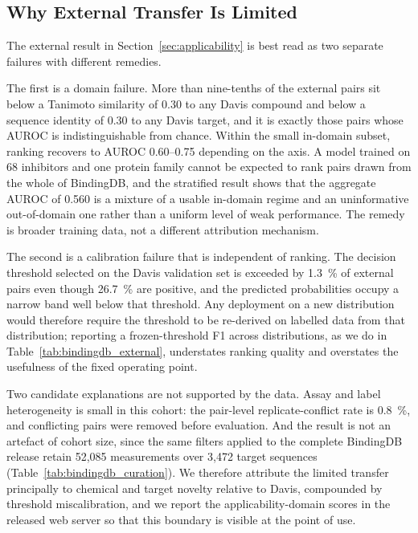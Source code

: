 \documentclass[fleqn,10pt]{wlscirep}
\begin{document}
\subsection{Why External Transfer Is Limited}
\label{sec:transfer}

The external result in Section~\ref{sec:applicability} is best read as two
separate failures with different remedies.

The first is a domain failure.  More than nine-tenths of the external pairs sit
below a Tanimoto similarity of 0.30 to any Davis compound and below a sequence
identity of 0.30 to any Davis target, and it is exactly those pairs whose AUROC
is indistinguishable from chance.  Within the small in-domain subset, ranking
recovers to AUROC 0.60--0.75 depending on the axis.  A model trained on 68
inhibitors and one protein family cannot be expected to rank pairs drawn from
the whole of BindingDB, and the stratified result shows that the aggregate
AUROC of 0.560 is a mixture of a usable in-domain regime and an uninformative
out-of-domain one rather than a uniform level of weak performance.  The remedy
is broader training data, not a different attribution mechanism.

The second is a calibration failure that is independent of ranking.  The
decision threshold selected on the Davis validation set is exceeded by
\SI{1.3}{\percent} of external pairs even though \SI{26.7}{\percent} are
positive, and the predicted probabilities occupy a narrow band well below that
threshold.  Any deployment on a new distribution would therefore require the
threshold to be re-derived on labelled data from that distribution; reporting a
frozen-threshold F1 across distributions, as we do in
Table~\ref{tab:bindingdb_external}, understates ranking quality and overstates
the usefulness of the fixed operating point.

Two candidate explanations are not supported by the data.  Assay and label
heterogeneity is small in this cohort: the pair-level replicate-conflict rate is
\SI{0.8}{\percent}, and conflicting pairs were removed before evaluation.  And
the result is not an artefact of cohort size, since the same filters applied to
the complete BindingDB release retain 52{,}085 measurements over 3{,}472 target
sequences (Table~\ref{tab:bindingdb_curation}).  We therefore attribute the
limited transfer principally to chemical and target novelty relative to Davis,
compounded by threshold miscalibration, and we report the applicability-domain
scores in the released web server so that this boundary is visible at the point
of use.
\end{document}
